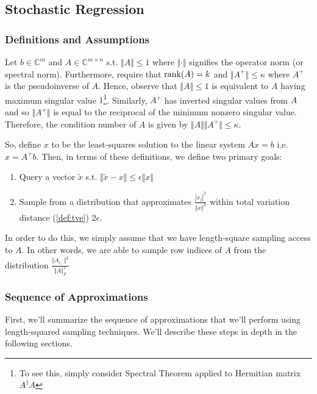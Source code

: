 \documentclass[11pt]{article}
\newcommand\0{\mathbf{0}}
\newcommand\CC{\mathbb{C}}
\newcommand\<{\langle}
\renewcommand\>{\rangle}
\begin{document}
\subsection{Stochastic Regression}

\subsubsection{Definitions and Assumptions}

Let $b \in \CC^m$ and $A \in \CC^{m \times n}$ s.t. $\Vert A \Vert \leq 1$ where $\Vert \cdot \Vert$ signifies the operator norm (or spectral norm). Furthermore, require that $\rank(A) = k$ and $\Vert A^+ \Vert \leq \kappa$ where $A^+$ is the pseudoinverse of $A$. Hence, observe that $\Vert A \Vert \leq 1$ is equivalent to $A$ having maximum singular value $1$\footnote{To see this, simply consider Spectral Theorem applied to Hermitian matrix $A^\dag A$}. Similarly, $A^+$ has inverted singular values from $A$ and so $\Vert A^+ \Vert$ is equal to the reciprocal of the minimum nonzero singular value. Therefore, the condition number of $A$ is given by $\Vert A \Vert \Vert A^+ \Vert \leq \kappa$.

So, define $x$ to be the least-squares solution to the linear system $Ax = b$ i.e. $x = A^+ b$. Then, in terms of these definitions, we define two primary goals:

\begin{enumerate}
\item Query a vector $\tilde{x}$ s.t. $\Vert \tilde{x} - x \Vert \leq \epsilon \Vert x \Vert$
\item Sample from a distribution that approximates $\frac{|x_j|^2}{\Vert x \Vert^2}$ within total variation distance (\autoref{def:tve}) $2\epsilon$.
\end{enumerate}

In order to do this, we simply assume that we have length-square sampling access to $A$. In other words, we are able to sample row indices of $A$ from the distribution $\frac{\Vert A_{i, \cdot}\Vert^2}{\Vert A \Vert^2_F}$

\subsubsection{Sequence of Approximations}

First, we'll summarize the sequence of approximations that we'll perform using length-squared sampling techniques. We'll describe these steps in depth in the following sections.
\end{document}

